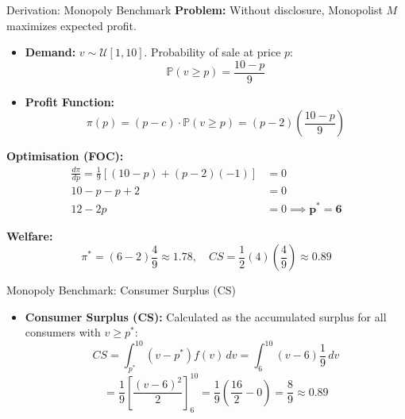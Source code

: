 \documentclass{beamer}
\begin{document}
\begin{frame}{Derivation: Monopoly Benchmark}\label{MB}
    \textbf{Problem:} Without disclosure, Monopolist $M$ maximizes expected profit.
    
    \begin{itemize}
        \item \textbf{Demand:} $v \sim \mathcal{U}[1,10]$. Probability of sale at price $p$:
        \[ \mathbb{P}(v \ge p) = \frac{10 - p}{9} \]
        \item \textbf{Profit Function:}
        \[ \pi(p) = (p - c) \cdot \mathbb{P}(v \ge p) = (p - 2) \left( \frac{10 - p}{9} \right) \]
    \end{itemize}

    \textbf{Optimisation (FOC):}
    \begin{align*}
        \frac{d\pi}{dp} = \frac{1}{9} \left[ (10-p) + (p-2)(-1) \right] &= 0 \\
        10 - p - p + 2 &= 0 \\
        12 - 2p &= 0 \implies \mathbf{p^* = 6}
    \end{align*}
    
    \textbf{Welfare:}
    \[ \pi^* = (6-2)\frac{4}{9} \approx 1.78, \quad CS = \frac{1}{2}(4)(\frac{4}{9}) \approx 0.89 \]
\end{frame}

\begin{frame}{Monopoly Benchmark: Consumer Surplus (CS)}
    \begin{itemize}
        \item \textbf{Consumer Surplus (CS):}
        Calculated as the accumulated surplus for all consumers with $v \ge p^*$:
        \[
            CS = \int_{p^*}^{10} (v - p^*) f(v) \, dv = \int_{6}^{10} (v - 6) \frac{1}{9} \, dv
        \]
        \[
            = \frac{1}{9} \left[ \frac{(v-6)^2}{2} \right]_{6}^{10} = \frac{1}{9} \left( \frac{16}{2} - 0 \right) = \frac{8}{9} \approx \mathbf{0.89}
        \]
    \end{itemize}
\end{frame}
\end{document}
